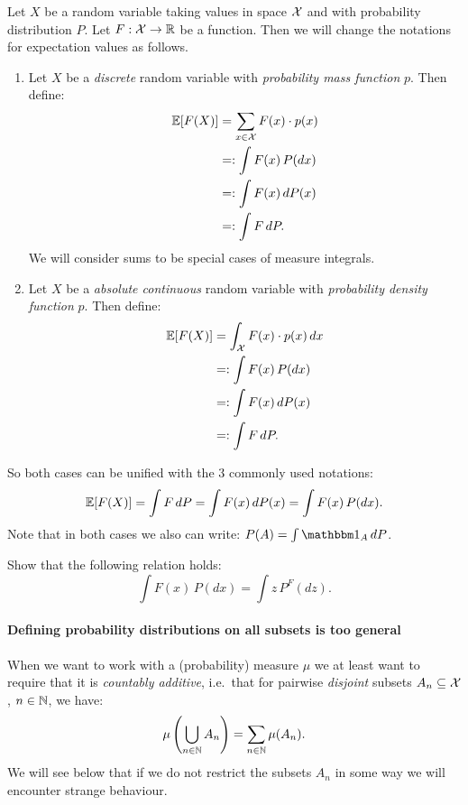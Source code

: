 \begin{Not}%
    Let $X$ be a  random variable taking values in space $\mathcal{X}$ and with probability distribution $P$.
    Let $F: \mathcal{X} \to \mathbb{R}$ be a function. Then we will change the notations for expectation values as follows.
 \begin{enumerate}
     \item Let $X$ be a \emph{discrete} random variable with \emph{probability mass function} $p$. Then define:
 \begin{align*}
     \mathbb{E}[F(X)] &= \sum_{x \in \mathcal{X}} F(x) \cdot p(x) \\
         &=: \int F(x)  \, P(dx)\\
         &=: \int F(x)  \, dP(x)\\
         &=: \int F  \, dP.
 \end{align*}
  We will consider sums to be special cases of measure integrals.
     \item Let $X$ be a \emph{absolute continuous} random variable with \emph{probability density function} $p$. Then define:
 \begin{align*}
     \mathbb{E}[F(X)] &= \int_{\mathcal{X}} F(x) \cdot p(x)\,dx \\
         &=: \int F(x)  \, P(dx)\\
         &=: \int F(x)  \, dP(x)\\
         &=: \int F  \, dP.
 \end{align*}
 \end{enumerate}
 So both cases can be unified with the 3 commonly used notations:
 \[ \mathbb{E}[F(X)] = \int F\,dP = \int F(x)\,dP(x) = \int F(x)\,P(dx).  \]
 Note that in both cases we also can write: $P(A) = \int \I_A \, dP$.
\end{Not}

\begin{Exc}
    Show that the following relation holds:
    \[ \int F(x)\,P(dx) = \int z \,P^F(dz).\]
\end{Exc}

\paragraph{Defining probability distributions on all subsets is too general}%

\begin{Rem}\label{rem-power-set}
    When we want to work with a (probability) measure $\mu$ we at least want to require that it is \emph{countably additive}, i.e.\ that for pairwise \emph{disjoint} subsets $A_n \subseteq \mathcal{X}$, $n \in \mathbb{N}$, we have:
    \[\mu\left (\bigcup_{n \in \mathbb{N}} A_n\right ) = \sum_{n \in \mathbb{N}} \mu(A_n).\]
    We will see below that if we do not restrict the subsets $A_n$ in some way we will encounter strange behaviour.
\end{Rem}

